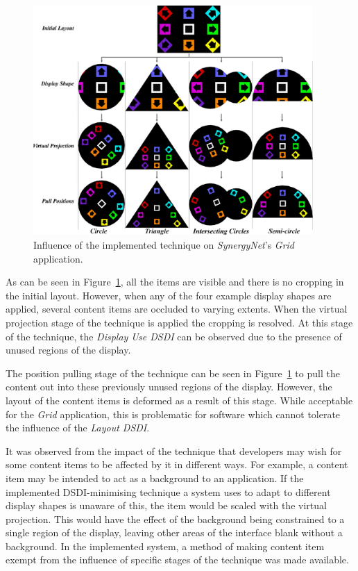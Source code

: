 \documentclass[twocolumn,compsoc]{cvm}
\begin{document}
{\begin{figure}[h!] 
 \centering
  \includegraphics[width=0.95\textwidth]{figures/GridApplication.jpeg}
  \caption{Influence of the implemented technique on {\emph{SynergyNet}}'s {\emph{Grid}} application.}
  \label{fig:gridApp}
\end{figure}

As can be seen in Figure~\ref{fig:gridApp}, all the items are visible and there is no cropping in the initial layout.
However, when any of the four example display shapes are applied, several content items are occluded to varying extents.
When the virtual projection stage of the technique is applied the cropping is resolved.
At this stage of the technique, the {\emph{Display Use \ac{DSDI}}} can be observed due to the presence of unused regions of the display.

The position pulling stage of the technique can be seen in Figure~\ref{fig:gridApp} to pull the content out into these previously unused regions of the display.
However, the layout of the content items is deformed as a result of this stage.
While acceptable for the {\emph{Grid}} application, this is problematic for software which cannot tolerate the influence of the {\emph{Layout \ac{DSDI}}}.

It was observed from the impact of the technique that developers may wish for some content items to be affected by it in different ways.
For example, a content item may be intended to act as a background to an application.
If the implemented \ac{DSDI}-minimising technique a system uses to adapt to different display shapes is unaware of this, the item would be scaled with the virtual projection.
This would have the effect of the background being constrained to a single region of the display, leaving other areas of the interface blank without a background.
In the implemented system, a method of making content item exempt from the influence of specific stages of the technique was made available.

}
\end{document}
